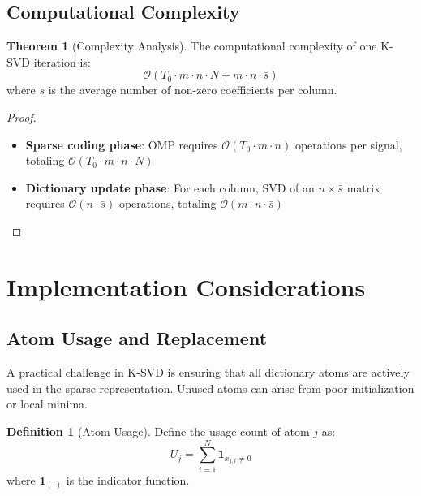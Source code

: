 \documentclass[12pt]{article}
\theoremstyle{definition}
\newtheorem{definition}{Definition}[section]
\newtheorem{theorem}{Theorem}[section]
\begin{document}
\subsection{Computational Complexity}

\begin{theorem}[Complexity Analysis]\label{thm:complexity}
    The computational complexity of one K-SVD iteration is:
    \begin{equation}
        \mathcal{O}(T_0 \cdot m \cdot n \cdot N + m \cdot n \cdot \bar{s})
    \end{equation}
    where $\bar{s}$ is the average number of non-zero coefficients per column.
\end{theorem}

\begin{proof}
    \begin{itemize}
        \item \textbf{Sparse coding phase}: OMP requires $\mathcal{O}(T_0 \cdot m \cdot n)$ operations per signal, totaling $\mathcal{O}(T_0 \cdot m \cdot n \cdot N)$
        \item \textbf{Dictionary update phase}: For each column, SVD of an $n \times \bar{s}$ matrix requires $\mathcal{O}(n \cdot \bar{s})$ operations, totaling $\mathcal{O}(m \cdot n \cdot \bar{s})$
    \end{itemize}
\end{proof}

\newpage

\section{Implementation Considerations}

\subsection{Atom Usage and Replacement}

A practical challenge in K-SVD is ensuring that all dictionary atoms are actively used in the sparse representation. Unused atoms can arise from poor initialization or local minima.

\begin{definition}[Atom Usage]
    Define the usage count of atom $j$ as:
    \begin{equation}
        U_j = \sum_{i=1}^N \mathbf{1}_{x_{j,i} \neq 0}
    \end{equation}
    where $\mathbf{1}_{(\cdot)}$ is the indicator function.
\end{definition}
\end{document}
